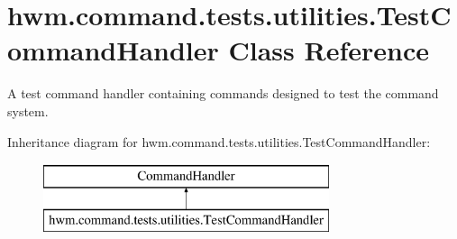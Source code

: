 \hypertarget{classhwm_1_1command_1_1tests_1_1utilities_1_1_test_command_handler}{\section{hwm.\-command.\-tests.\-utilities.\-Test\-Command\-Handler Class Reference}
\label{classhwm_1_1command_1_1tests_1_1utilities_1_1_test_command_handler}
}


A test command handler containing commands designed to test the command system.  


Inheritance diagram for hwm.\-command.\-tests.\-utilities.\-Test\-Command\-Handler\-:\begin{figure}[H]
\begin{center}
\leavevmode
\includegraphics[height=2.000000cm]{classhwm_1_1command_1_1tests_1_1utilities_1_1_test_command_handler}
\end{center}
\end{figure}
